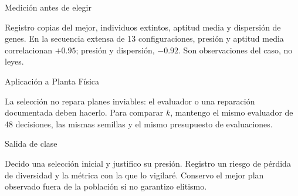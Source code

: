 \begin{frame}{Medición antes de elegir}

Registro copias del mejor, individuos extintos, aptitud media y dispersión de genes. En la secuencia extensa de 13 configuraciones, presión y aptitud media correlacionan $+0.95$; presión y dispersión, $-0.92$. Son observaciones del caso, no leyes.

\end{frame}

\begin{frame}{Aplicación a Planta Física}

La selección no repara planes inviables: el evaluador o una reparación documentada deben hacerlo. Para comparar $k$, mantengo el mismo evaluador de 48 decisiones, las mismas semillas y el mismo presupuesto de evaluaciones.

\end{frame}

\begin{frame}{Salida de clase}

Decido una selección inicial y justifico su presión. Registro un riesgo de pérdida de diversidad y la métrica con la que lo vigilaré. Conservo el mejor plan observado fuera de la población si no garantizo elitismo.

\end{frame}


